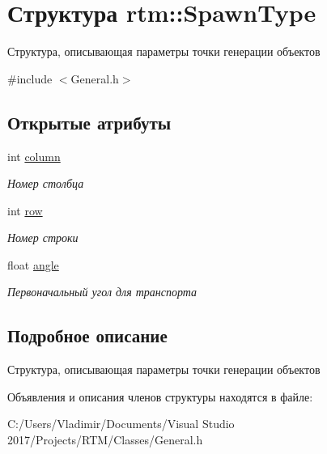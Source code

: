 \hypertarget{structrtm_1_1_spawn_type}{}\section{Структура rtm\+:\+:Spawn\+Type}
\label{structrtm_1_1_spawn_type}


Структура, описывающая параметры точки генерации объектов  




{\ttfamily \#include $<$General.\+h$>$}

\subsection*{Открытые атрибуты}
\begin{DoxyCompactItemize}
\item 
\mbox{\label{structrtm_1_1_spawn_type_a0759515d2a862efac57fa838d706cc6f}} 
int \hyperlink{structrtm_1_1_spawn_type_a0759515d2a862efac57fa838d706cc6f}{column}
\begin{DoxyCompactList}\small\item\em Номер столбца \end{DoxyCompactList}\item 
\mbox{\label{structrtm_1_1_spawn_type_a098608b3e4273cbd65525acd8d8cbca1}} 
int \hyperlink{structrtm_1_1_spawn_type_a098608b3e4273cbd65525acd8d8cbca1}{row}
\begin{DoxyCompactList}\small\item\em Номер строки \end{DoxyCompactList}\item 
\mbox{\label{structrtm_1_1_spawn_type_ad375d97cdd10099f5e48fd8baf3b1145}} 
float \hyperlink{structrtm_1_1_spawn_type_ad375d97cdd10099f5e48fd8baf3b1145}{angle}
\begin{DoxyCompactList}\small\item\em Первоначальный угол для транспорта \end{DoxyCompactList}\end{DoxyCompactItemize}


\subsection{Подробное описание}
Структура, описывающая параметры точки генерации объектов 

Объявления и описания членов структуры находятся в файле\+:\begin{DoxyCompactItemize}
\item 
C\+:/\+Users/\+Vladimir/\+Documents/\+Visual Studio 2017/\+Projects/\+R\+T\+M/\+Classes/General.\+h\end{DoxyCompactItemize}
